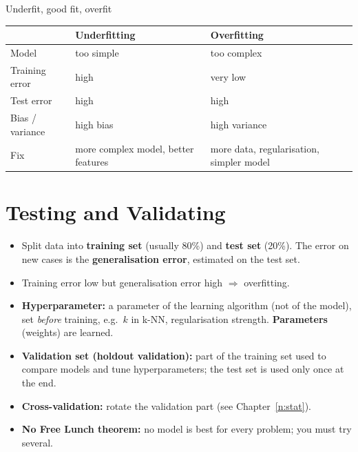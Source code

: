 \begin{drawit}{Underfit, good fit, overfit}
\centering
{}
\end{drawit}

\begin{center}
\small
\begin{tabular}{@{}p{2.8cm}p{6.6cm}p{6.6cm}@{}}
\toprule
 & \textbf{Underfitting} & \textbf{Overfitting}\\
\midrule
Model & too simple & too complex\\
Training error & high & very low\\
Test error & high & high\\
Bias / variance & high bias & high variance\\
Fix & more complex model, better features & more data, regularisation, simpler model\\
\bottomrule
\end{tabular}
\end{center}

\section{Testing and Validating}
\begin{itemize}
  \item Split data into \textbf{training set} (usually 80\%) and \textbf{test set} (20\%). The error on new cases is the \textbf{generalisation error}, estimated on the test set.
  \item Training error low but generalisation error high $\Rightarrow$ overfitting.
  \item \textbf{Hyperparameter:} a parameter of the learning algorithm (not of the model), set \emph{before} training, e.g.\ $k$ in k-NN, regularisation strength. \textbf{Parameters} (weights) are learned.
  \item \textbf{Validation set (holdout validation):} part of the training set used to compare models and tune hyperparameters; the test set is used only once at the end.
  \item \textbf{Cross-validation:} rotate the validation part (see Chapter~\ref{n:stat}).
  \item \textbf{No Free Lunch theorem:} no model is best for every problem; you must try several.
\end{itemize}

